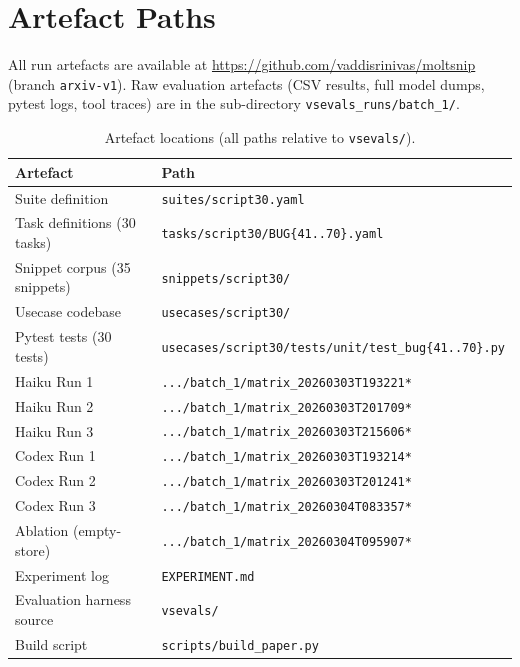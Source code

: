 \documentclass[10pt,a4paper,twocolumn]{article}
\begin{document}
\section{Artefact Paths}
\label{app:artefacts}

All run artefacts are available at
\url{https://github.com/vaddisrinivas/moltsnip} (branch \texttt{arxiv-v1}).
Raw evaluation artefacts (CSV results, full model dumps, pytest logs,
tool traces) are in the sub-directory \texttt{vsevals\_runs/batch\_1/}.

\begin{table}[H]
\centering
\caption{Artefact locations (all paths relative to \texttt{vsevals/}).}
\label{tab:artefacts}
\footnotesize
\begin{tabular}{@{}lp{7cm}@{}}
\toprule
\textbf{Artefact} & \textbf{Path} \\
\midrule
Suite definition             & \texttt{suites/script30.yaml} \\
Task definitions (30 tasks)  & \texttt{tasks/script30/BUG\{41..70\}.yaml} \\
Snippet corpus (35 snippets) & \texttt{snippets/script30/} \\
Usecase codebase             & \texttt{usecases/script30/} \\
Pytest tests (30 tests)      & \texttt{usecases/script30/tests/unit/test\_bug\{41..70\}.py} \\
Haiku Run 1                  & \texttt{.../batch\_1/matrix\_20260303T193221*} \\
Haiku Run 2                  & \texttt{.../batch\_1/matrix\_20260303T201709*} \\
Haiku Run 3                  & \texttt{.../batch\_1/matrix\_20260303T215606*} \\
Codex Run 1                  & \texttt{.../batch\_1/matrix\_20260303T193214*} \\
Codex Run 2                  & \texttt{.../batch\_1/matrix\_20260303T201241*} \\
Codex Run 3                  & \texttt{.../batch\_1/matrix\_20260304T083357*} \\
Ablation (empty-store)       & \texttt{.../batch\_1/matrix\_20260304T095907*} \\
Experiment log               & \texttt{EXPERIMENT.md} \\
Evaluation harness source    & \texttt{vsevals/} \\
Build script                 & \texttt{scripts/build\_paper.py} \\
\bottomrule
\end{tabular}
\end{table}
\end{document}
